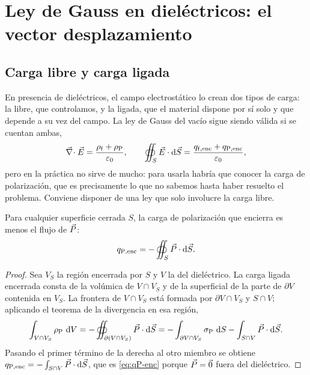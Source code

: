 \section{Ley de Gauss en dieléctricos: el vector desplazamiento}\label{sec:desplazamiento}

\subsection{Carga libre y carga ligada}\label{sec:gauss-D}

En presencia de dieléctricos, el campo electrostático lo crean dos tipos de carga: la libre, que
controlamos, y la ligada, que el material dispone por sí solo y que depende a su vez del campo. La ley de
Gauss del vacío sigue siendo válida si se cuentan ambas,
\begin{equation}\label{eq:gauss-total}
  \vec\nabla\!\cdot\vec E=\frac{\rho_{\mathrm f}+\rho_{\mathrm P}}{\varepsilon_0},\qquad
  \oiint_S\vec E\cdot\mathop{}\!\mathrm{d}\vec S=\frac{q_{\mathrm{f,enc}}+q_{\mathrm{P,enc}}}{\varepsilon_0},
\end{equation}
pero en la práctica no sirve de mucho: para usarla habría que conocer la carga de polarización, que es
precisamente lo que no sabemos hasta haber resuelto el problema. Conviene disponer de una ley que solo
involucre la carga libre.

\begin{lema}\label{lem:qP-enc}
Para cualquier superficie cerrada $S$, la carga de polarización que encierra es menos el flujo de $\vec P$:
\begin{equation}\label{eq:qP-enc}
  q_{\mathrm{P,enc}}=-\oiint_S\vec P\cdot\mathop{}\!\mathrm{d}\vec S .
\end{equation}
\end{lema}

\begin{proof}
Sea $V_S$ la región encerrada por $S$ y $V$ la del dieléctrico. La carga ligada encerrada consta de la
volúmica de $V\cap V_S$ y de la superficial de la parte de $\partial V$ contenida en $V_S$. La frontera de
$V\cap V_S$ está formada por $\partial V\cap V_S$ y $S\cap V$; aplicando el teorema de la divergencia en esa región,
\[
  \int_{V\cap V_S}\rho_{\mathrm P}\,\mathop{}\!\mathrm{d} V=-\oiint_{\partial(V\cap V_S)}\vec P\cdot\mathop{}\!\mathrm{d}\vec S
  =-\int_{\partial V\cap V_S}\sigma_{\mathrm P}\,\mathop{}\!\mathrm{d} S-\int_{S\cap V}\vec P\cdot\mathop{}\!\mathrm{d}\vec S .
\]
Pasando el primer término de la derecha al otro miembro se obtiene $q_{\mathrm{P,enc}}=-\int_{S\cap V}\vec P\cdot\mathop{}\!\mathrm{d}\vec S$, que es
\eqref{eq:qP-enc} porque $\vec P=\vec 0$ fuera del dieléctrico.
\end{proof}

